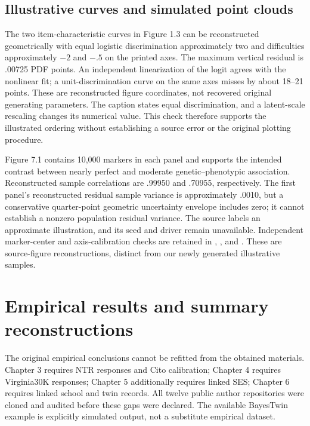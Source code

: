 \subsection{Illustrative curves and simulated point clouds}
The two item-characteristic curves in Figure 1.3 can be reconstructed geometrically with equal logistic discrimination approximately two and difficulties approximately $-2$ and $-.5$ on the printed axes. The maximum vertical residual is .00725 PDF points. An independent linearization of the logit agrees with the nonlinear fit; a unit-discrimination curve on the same axes misses by about 18--21 points. These are reconstructed figure coordinates, not recovered original generating parameters. The caption states equal discrimination, and a latent-scale rescaling changes its numerical value. This check therefore supports the illustrated ordering without establishing a source error or the original plotting procedure.

Figure 7.1 contains 10,000 markers in each panel and supports the intended contrast between nearly perfect and moderate genetic--phenotypic association. Reconstructed sample correlations are .99950 and .70955, respectively. The first panel's reconstructed residual sample variance is approximately .0010, but a conservative quarter-point geometric uncertainty envelope includes zero; it cannot establish a nonzero population residual variance. The source labels an approximate illustration, and its seed and driver remain unavailable. Independent marker-center and axis-calibration checks are retained in , , and . These are source-figure reconstructions, distinct from our newly generated illustrative samples.

\section{Empirical results and summary reconstructions}
The original empirical conclusions cannot be refitted from the obtained materials. Chapter 3 requires NTR responses and Cito calibration; Chapter 4 requires Virginia30K responses; Chapter 5 additionally requires linked SES; Chapter 6 requires linked school and twin records. All twelve public author repositories were cloned and audited before these gaps were declared. The available BayesTwin example is explicitly simulated output, not a substitute empirical dataset.

